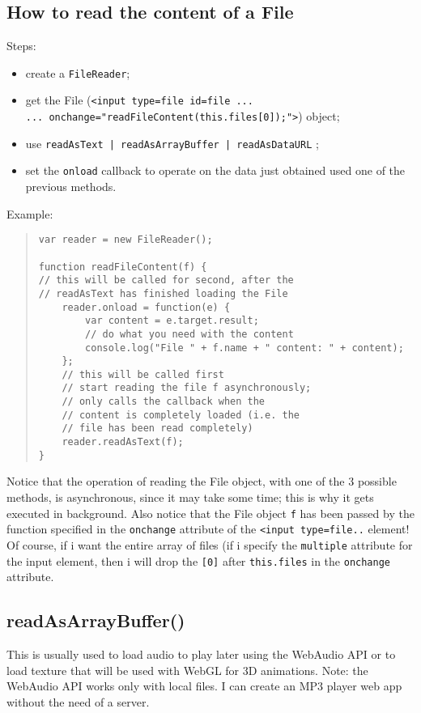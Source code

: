 \documentclass[a4paper,11pt]{book}
\begin{document}
\subsection{How to read the content of a File}
Steps:
\begin{itemize}
\item create a \texttt{FileReader};
\item get the File (\texttt{<input type=file id=file ...} \\
\texttt{... onchange="readFileContent(this.files[0]);">}) object;
\item use \texttt{readAsText | readAsArrayBuffer | readAsDataURL} ;
\item set the \texttt{onload} callback to operate on the data just obtained
used one of the previous methods.
\end{itemize}
Example:
\begin{verse}
\begin{verbatim}
var reader = new FileReader();

function readFileContent(f) {
// this will be called for second, after the
// readAsText has finished loading the File
	reader.onload = function(e) {
		var content = e.target.result;
		// do what you need with the content
		console.log("File " + f.name + " content: " + content);
	};
	// this will be called first
	// start reading the file f asynchronously;
	// only calls the callback when the
	// content is completely loaded (i.e. the
	// file has been read completely)
	reader.readAsText(f);
}
\end{verbatim}
\end{verse}
Notice that the operation of reading the File object, with one of the 3 possible methods, is
asynchronous, since it may take some time; this is why it gets executed in background.
Also notice that the File object \texttt{f} has been passed by the function specified
in the \texttt{onchange} attribute of the \texttt{<input type=file..} element!
Of course, if i want the entire array of files (if i specify the \texttt{multiple}
attribute for the input element, then i will drop the \texttt{[0]} after \texttt{this.files}
in the \texttt{onchange} attribute.

\subsection{readAsArrayBuffer()}
This is usually used to load audio to play later using the WebAudio API or to load texture that
will be used with WebGL for 3D animations.
Note: the WebAudio API works only with local files. I can create an MP3 player web app without
the need of a server.
\end{document}
